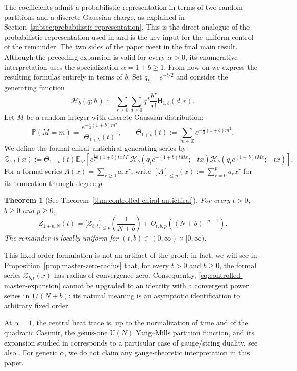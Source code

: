 \documentclass[11pt,a4paper,reqno]{article}
\newtheorem{theorem}{Theorem}[section]
\theoremstyle{definition}
\theoremstyle{remark}
\newcommand\U{{\mathrm U}}
\newcommand\Z{{\mathbb Z}}
\newcommand\E{{\mathbb E}}
\newcommand\Pbb{{\mathbb P}}
\newcommand\Hb{{\mathsf H}}
\begin{document}
The coefficients admit a probabilistic representation in terms of two random partitions and a discrete Gaussian charge, as explained in Section~\ref{subsec:probabilistic-representation}.  This is the direct analogue of the probabilistic representation used in \cite{LemMai25,LM2} and is the key input for the uniform control of the remainder.  The two sides of the paper meet in the final main result.  Although the preceding expansion is valid for every $\alpha>0$, its enumerative interpretation uses the specialization $\alpha=1+b\geq1$.  From now on we express the resulting formulas entirely in terms of $b$.  Set $q_t=e^{-t/2}$ and consider the generating function
\[
\mathscr H_b(q;\hbar):=\sum_{r\geq0}\sum_{d\geq0}q^d\frac{\hbar^r}{r!}\Hb_{1,b}(d,r).
\]
Let $M$ be a random integer with discrete Gaussian distribution:
\[
\Pbb(M=m)=\frac{e^{-\frac t2(1+b)m^2}}{\Theta_{1+b}(t)},\qquad\Theta_{1+b}(t):=\sum_{m\in\Z}e^{-\frac t2(1+b)m^2}.
\]
We define the formal chiral--antichiral generating series by
\[
\mathcal Z_{b,t}(x):=\Theta_{1+b}(t)\E_M\left[e^{\frac12 b(1+b)txM^2}\mathscr H_b(q_t e^{-(1+b)tMx};-tx)\mathscr H_b(q_t e^{(1+b)tMx};-tx)\right].
\]
For a formal series $A(x)=\sum_{r\geq0}a_rx^r$, write $[A]_{\leq p}(x):=\sum_{r=0}^pa_rx^r$ for its truncation through degree $p$.

\begin{theorem}[See Theorem~\ref{thm:controlled-chiral-antichiral}]
For every $t>0$, $b\geq0$ and $p\geq0$,
\begin{equation}\label{eq:controlled-master-expansion}
Z_{1+b,N}(t) =\bigl[\mathcal Z_{b,t}\bigr]_{\leq p}\left(\frac{1}{N+b}\right) +O_{t,b,p}\left((N+b)^{-p-1}\right).
\end{equation}
The remainder is locally uniform for $(t,b)\in(0,\infty)\times[0,\infty)$.
\end{theorem}

This fixed-order formulation is not an artifact of the proof: in fact, we will see in Proposition~\ref{prop:master-zero-radius} that, for every $t>0$ and $b\geq0$, the formal series $\mathcal Z_{b,t}(x)$ has radius of convergence zero.  Consequently, \eqref{eq:controlled-master-expansion} cannot be upgraded to an identity with a convergent power series in $1/(N+b)$: its natural meaning is an asymptotic identification to arbitrary fixed order.

At $\alpha=1$, the central heat trace is, up to the normalization of time and of the quadratic Casimir, the genus-one $\U(N)$ Yang--Mills partition function, and its expansion studied in \cite{LemMai25,LM2} corresponds to a particular case of gauge/string duality, see also \cite{GrossTaylor93,Dijkgraaf95,Lem26survey}.  For generic $\alpha$, we do not claim any gauge-theoretic interpretation in this paper.
\end{document}
